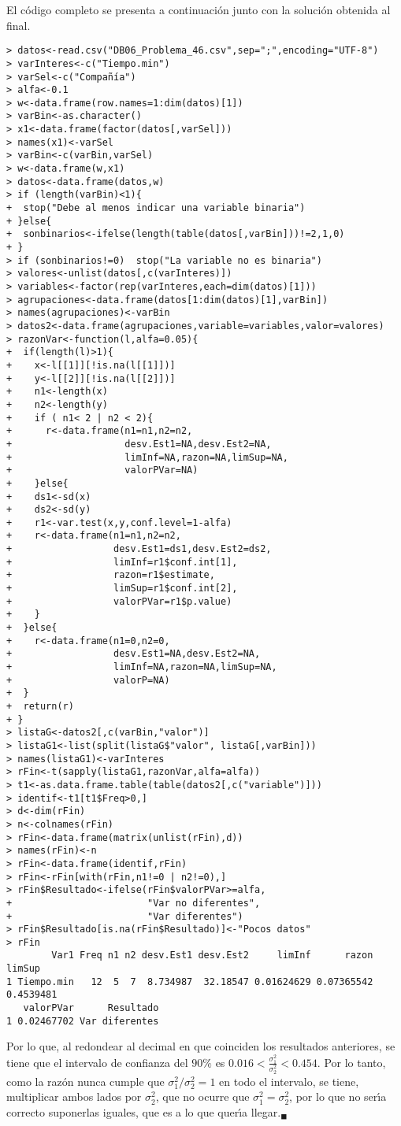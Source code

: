 \begin{solucion}
 \par 
 El c\'odigo completo se presenta a continuaci\'on junto con la soluci\'on obtenida al final.
 \begin{verbatim}
> datos<-read.csv("DB06_Problema_46.csv",sep=";",encoding="UTF-8")
> varInteres<-c("Tiempo.min")
> varSel<-c("Compañía")
> alfa<-0.1
> w<-data.frame(row.names=1:dim(datos)[1])
> varBin<-as.character()
> x1<-data.frame(factor(datos[,varSel]))
> names(x1)<-varSel
> varBin<-c(varBin,varSel)
> w<-data.frame(w,x1)
> datos<-data.frame(datos,w)
> if (length(varBin)<1){
+  stop("Debe al menos indicar una variable binaria")
+ }else{
+  sonbinarios<-ifelse(length(table(datos[,varBin]))!=2,1,0)
+ }
> if (sonbinarios!=0)  stop("La variable no es binaria")
> valores<-unlist(datos[,c(varInteres)])
> variables<-factor(rep(varInteres,each=dim(datos)[1]))
> agrupaciones<-data.frame(datos[1:dim(datos)[1],varBin])
> names(agrupaciones)<-varBin
> datos2<-data.frame(agrupaciones,variable=variables,valor=valores)
> razonVar<-function(l,alfa=0.05){
+  if(length(l)>1){
+    x<-l[[1]][!is.na(l[[1]])]
+    y<-l[[2]][!is.na(l[[2]])]
+    n1<-length(x)
+    n2<-length(y)
+    if ( n1< 2 | n2 < 2){
+      r<-data.frame(n1=n1,n2=n2,
+                    desv.Est1=NA,desv.Est2=NA,
+                    limInf=NA,razon=NA,limSup=NA,
+                    valorPVar=NA)
+    }else{ 
+    ds1<-sd(x)
+    ds2<-sd(y)
+    r1<-var.test(x,y,conf.level=1-alfa)
+    r<-data.frame(n1=n1,n2=n2,
+                  desv.Est1=ds1,desv.Est2=ds2,
+                  limInf=r1$conf.int[1],
+                  razon=r1$estimate,
+                  limSup=r1$conf.int[2],
+                  valorPVar=r1$p.value)
+    }
+  }else{
+    r<-data.frame(n1=0,n2=0,
+                  desv.Est1=NA,desv.Est2=NA,
+                  limInf=NA,razon=NA,limSup=NA,
+                  valorP=NA)
+  }
+  return(r)
+ }
> listaG<-datos2[,c(varBin,"valor")]
> listaG1<-list(split(listaG$"valor", listaG[,varBin]))
> names(listaG1)<-varInteres
> rFin<-t(sapply(listaG1,razonVar,alfa=alfa))
> t1<-as.data.frame.table(table(datos2[,c("variable")]))
> identif<-t1[t1$Freq>0,]
> d<-dim(rFin)
> n<-colnames(rFin)
> rFin<-data.frame(matrix(unlist(rFin),d))
> names(rFin)<-n
> rFin<-data.frame(identif,rFin)
> rFin<-rFin[with(rFin,n1!=0 | n2!=0),]
> rFin$Resultado<-ifelse(rFin$valorPVar>=alfa,
+                        "Var no diferentes",
+                        "Var diferentes")
> rFin$Resultado[is.na(rFin$Resultado)]<-"Pocos datos"
> rFin
        Var1 Freq n1 n2 desv.Est1 desv.Est2     limInf      razon    limSup
1 Tiempo.min   12  5  7  8.734987  32.18547 0.01624629 0.07365542 0.4539481
   valorPVar      Resultado
1 0.02467702 Var diferentes
 \end{verbatim}
 \vspace{-0.5cm}
 Por lo que, al redondear al decimal en que coinciden los resultados anteriores, se tiene que el intervalo de confianza del $90\%$ es $0.016 < \frac{\sigma_1^2}{\sigma_2^2} < 0.454$. Por lo tanto, como la raz\'on nunca cumple que $\sigma_1^2/\sigma_2^2 = 1$ en todo el intervalo, se tiene, multiplicar ambos lados por $\sigma_2^2$, que no ocurre que $\sigma_1^2 = \sigma_2^2$, por lo que no ser\'{\i}a correcto suponerlas iguales, que es a lo que quer\'{\i}a llegar.${}_{\blacksquare}$
\end{solucion}
